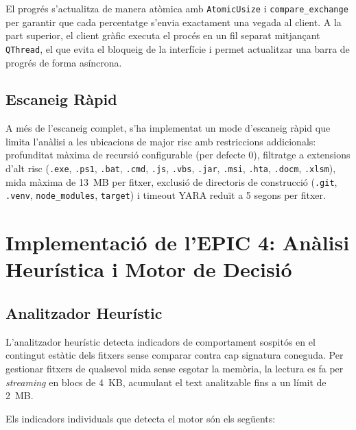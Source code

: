 \documentclass[12pt,a4paper]{report}
\begin{document}
El progrés s'actualitza de manera atòmica amb \texttt{AtomicUsize} i \texttt{compare\_exchange} per garantir que cada percentatge s'envia exactament una vegada al client. A la part superior, el client gràfic executa el procés en un fil separat mitjançant \texttt{QThread}, el que evita el bloqueig de la interfície i permet actualitzar una barra de progrés de forma asíncrona.

\subsection{Escaneig Ràpid}
A més de l'escaneig complet, s'ha implementat un mode d'escaneig ràpid que limita l'anàlisi a les ubicacions de major risc amb restriccions addicionals: profunditat màxima de recursió configurable (per defecte 0), filtratge a extensions d'alt risc (\texttt{.exe}, \texttt{.ps1}, \texttt{.bat}, \texttt{.cmd}, \texttt{.js}, \texttt{.vbs}, \texttt{.jar}, \texttt{.msi}, \texttt{.hta}, \texttt{.docm}, \texttt{.xlsm}), mida màxima de 13~MB per fitxer, exclusió de directoris de construcció (\texttt{.git}, \texttt{.venv}, \texttt{node\_modules}, \texttt{target}) i timeout YARA reduït a 5 segons per fitxer.

\section{Implementació de l'EPIC 4: Anàlisi Heurística i Motor de Decisió}

\subsection{Analitzador Heurístic}
L'analitzador heurístic detecta indicadors de comportament sospitós en el contingut estàtic dels fitxers sense comparar contra cap signatura coneguda. Per gestionar fitxers de qualsevol mida sense esgotar la memòria, la lectura es fa per \textit{streaming} en blocs de 4~KB, acumulant el text analitzable fins a un límit de 2~MB.

Els indicadors individuals que detecta el motor són els següents:
\end{document}
